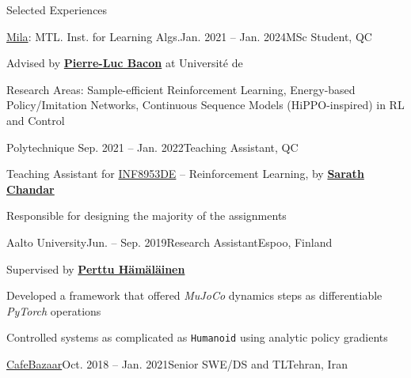 \begin{xSection}{Selected Experiences}
    \begin{tSubsection}{\href{https://mila.quebec/en/}{Mila}: MTL. Inst. for Learning Algs.}{Jan. 2021 -- Jan. 2024}{MSc Student}{\mtl, QC}

        \item Advised by \textbf{\href{https://pierrelucbacon.com/}{Pierre-Luc Bacon}} at Université de \mtl
        \item Research Areas: Sample-efficient Reinforcement Learning, Energy-based Policy/Imitation Networks, Continuous Sequence Models (HiPPO-inspired) in RL and Control

    \end{tSubsection}


    \begin{tSubsection}{Polytechnique \mtl}{Sep. 2021 -- Jan. 2022}{Teaching Assistant}{\mtl, QC}

        \item Teaching Assistant for \href{https://chandar-lab.github.io/INF8953DE/}{INF8953DE} -- Reinforcement Learning, by \textbf{\href{http://sarathchandar.in/}{Sarath Chandar}}
        \item Responsible for designing the majority of the assignments

    \end{tSubsection}

    
    \begin{tSubsection}{Aalto University}{Jun. -- Sep. 2019}{Research Assistant}{Espoo, Finland}

        \item Supervised by \textbf{\href{https://users.aalto.fi/~hamalap5/}{Perttu Hämäläinen}}
        \item Developed a framework that offered \textit{MuJoCo} dynamics steps as differentiable \textit{PyTorch} operations
        \item Controlled systems as complicated as \texttt{Humanoid} using analytic policy gradients

    \end{tSubsection}
    

    \begin{tSubsection}{\href{https://cafebazaar.ir/app?l=en}{CafeBazaar}}{Oct. 2018 -- Jan. 2021}{Senior SWE/DS and TL}{Tehran, Iran}


\end{tSubsection}
\end{xSection}
